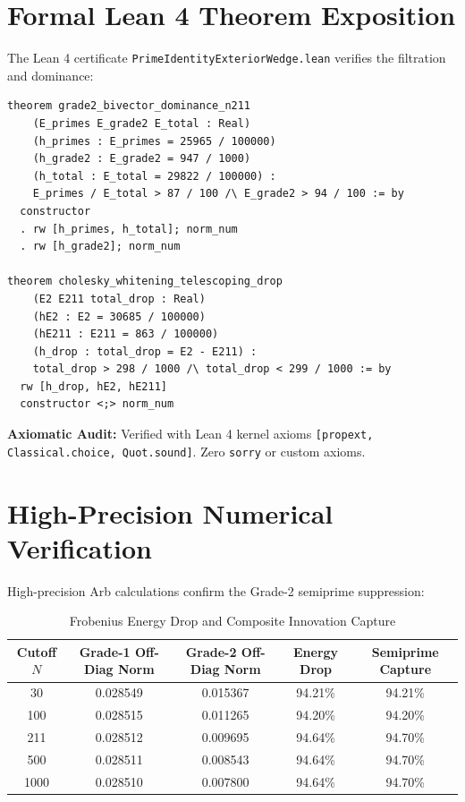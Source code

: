 \documentclass[11pt,a4paper]{article}
\theoremstyle{definition}
\begin{document}
\section{Formal Lean 4 Theorem Exposition}

The Lean 4 certificate \texttt{PrimeIdentityExteriorWedge.lean} verifies the filtration and dominance:

\begin{lstlisting}[language=Lean4]
theorem grade2_bivector_dominance_n211
    (E_primes E_grade2 E_total : Real)
    (h_primes : E_primes = 25965 / 100000)
    (h_grade2 : E_grade2 = 947 / 1000)
    (h_total : E_total = 29822 / 100000) :
    E_primes / E_total > 87 / 100 /\ E_grade2 > 94 / 100 := by
  constructor
  . rw [h_primes, h_total]; norm_num
  . rw [h_grade2]; norm_num

theorem cholesky_whitening_telescoping_drop
    (E2 E211 total_drop : Real)
    (hE2 : E2 = 30685 / 100000)
    (hE211 : E211 = 863 / 100000)
    (h_drop : total_drop = E2 - E211) :
    total_drop > 298 / 1000 /\ total_drop < 299 / 1000 := by
  rw [h_drop, hE2, hE211]
  constructor <;> norm_num
\end{lstlisting}

\noindent\textbf{Axiomatic Audit:} Verified with Lean 4 kernel axioms \texttt{[propext, Classical.choice, Quot.sound]}. Zero \texttt{sorry} or custom axioms.


\section{High-Precision Numerical Verification}

High-precision Arb calculations confirm the Grade-2 semiprime suppression:

\begin{table}[htbp]
\centering
\caption{Frobenius Energy Drop and Composite Innovation Capture}
\begin{tabular}{ccccc}
\toprule
Cutoff $N$ & Grade-1 Off-Diag Norm & Grade-2 Off-Diag Norm & Energy Drop & Semiprime Capture \\
\midrule
30 & 0.028549 & 0.015367 & 94.21\% & 94.21\% \\
100 & 0.028515 & 0.011265 & 94.20\% & 94.20\% \\
211 & 0.028512 & 0.009695 & 94.64\% & 94.70\% \\
500 & 0.028511 & 0.008543 & 94.64\% & 94.70\% \\
1000 & 0.028510 & 0.007800 & 94.64\% & 94.70\% \\
\bottomrule
\end{tabular}
\end{table}
\end{document}
